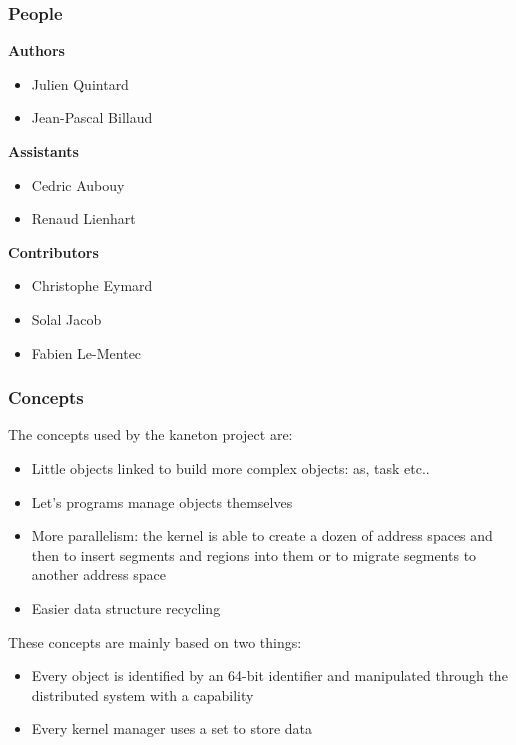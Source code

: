 \begin{frame}
  \frametitle{People}

  \textbf{Authors}

  \begin{itemize}
    \item
      Julien Quintard
    \item
      Jean-Pascal Billaud
  \end{itemize}

  \nl

  \textbf{Assistants}

  \begin{itemize}
    \item
      Cedric Aubouy
    \item
      Renaud Lienhart
  \end{itemize}

  \nl

  \textbf{Contributors}

  \begin{itemize}
    \item
      Christophe Eymard
    \item
      Solal Jacob
    \item
      Fabien Le-Mentec
  \end{itemize}
\end{frame}


\begin{frame}
  \frametitle{Concepts}

  The concepts used by the kaneton project are:

  \begin{itemize}
    \item
      Little objects linked to build more complex objects:
      as, task etc..
    \item
      Let's programs manage objects themselves
    \item
      More parallelism: the kernel is able to create a dozen
      of address spaces and then to insert segments and regions
      into them or to migrate segments to another address space
    \item
      Easier data structure recycling
  \end{itemize}

  These concepts are mainly based on two things:

  \begin{itemize}
    \item
      Every object is identified by an 64-bit identifier and manipulated
      through the distributed system with a capability
    \item
      Every kernel manager uses a set to store data
  \end{itemize}
\end{frame}

